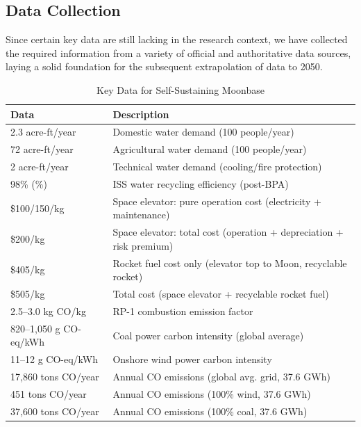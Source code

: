 \documentclass{mcmthesis}
\begin{document}
	\subsection{Data Collection}
		Since certain key data are still lacking in the research context, we have collected the required information from a variety of official and authoritative data sources, laying a solid foundation for the subsequent extrapolation of data to 2050.\\
\begin{table}[htbp]
	\centering
	\caption{Key Data for Self-Sustaining Moonbase}
	\label{tab:moonbase_data_source}
	\begin{tabularx}{\linewidth}{lX}
		\toprule
		\textbf{Data} & \textbf{Description} \\
		\midrule
		2.3 acre-ft/year & Domestic water demand (100 people/year) \cite{gerald20xxwater} \\
		72 acre-ft/year & Agricultural water demand (100 people/year) \cite{gerald20xxwater} \\
		2 acre-ft/year & Technical water demand (cooling/fire protection) \cite{gerald20xxwater} \\
		98\% (\textpm5\%) & ISS water recycling efficiency (post-BPA) \cite{wil20xxiss} \\
		\$100/150/kg & Space elevator: pure operation cost (electricity + maintenance)\cite{isec2019mars} \\
		\$200/kg & Space elevator: total cost (operation + depreciation + risk premium)\cite{isec2019mars} \\
		\$405/kg & Rocket fuel cost only (elevator top to Moon, recyclable rocket) \cite{isec2019mars}\\
		\$505/kg & Total cost (space elevator + recyclable rocket fuel) \cite{isec2019mars}\\
		2.5–3.0 kg CO/kg & RP-1 combustion emission factor \cite{ipcc2014ar5} \\
		820–1,050 g CO-eq/kWh & Coal power carbon intensity (global average) \cite{ipcc2014ar5} \\
		11–12 g CO-eq/kWh & Onshore wind power carbon intensity \cite{ipcc2014ar5} \\
		17,860 tons CO/year & Annual CO emissions (global avg. grid, 37.6 GWh) \cite{ipcc2014ar5} \\
		451 tons CO/year & Annual CO emissions (100\% wind, 37.6 GWh) \cite{ipcc2014ar5} \\
		37,600 tons CO/year & Annual CO emissions (100\% coal, 37.6 GWh) \cite{ipcc2014ar5} \\
		\bottomrule
	\end{tabularx}
\end{table}
\end{document}
